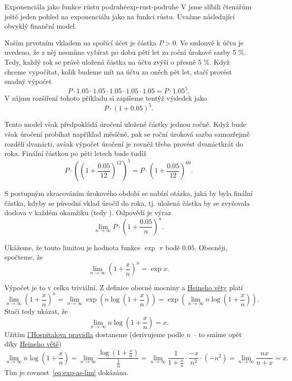 \begin{example}{Exponenciála jako funkce růstu podruhé}{exp-rust-podruhe}
 V  jsme slíbili čtenářům ještě
 jeden pohled na exponenciálu jako na funkci  růstu. Uvažme
 následující obvyklý finanční model.

 Naším prvotním vkladem na spořící účet je částka $P > 0$. Ve smlouvě k účtu je
 uvedeno, že z něj nesmíme vybírat po dobu pěti let za roční úrokové sazby 5 \%.
 Tedy, každý rok se právě uložená částka na účtu zvýší o přesně 5 \%. Když
 chceme vypočítat, kolik budeme mít na účtu za oněch pět let, stačí provést
 snadný výpočet
 \[
  P \cdot 1.05 \cdot 1.05 \cdot 1.05 \cdot 1.05 \cdot 1.05 = P \cdot 1.05^{5}.
 \]
 V zájmu rozšíření tohoto příkladu si zapíšeme tentýž výsledek jako
 \[
  P \cdot \left( 1 + 0.05 \right)^{5}.
 \]
 
 Tento model však předpokládá úročení uložené částky jednou ročně. Když bude
 však úročení probíhat například měsíčně, pak se roční úroková sazba samozřejmě
 rozdělí dvanácti, avšak výpočet úročení je rovněž třeba provést dvanáctkrát do
 roka. Finální částkou po pěti letech bude tudíž
 \[
  P \cdot \left(\left( 1 + \frac{0.05}{12} \right)^{12}\right)^{5} = P \cdot
  \left( 1 + \frac{0.05}{12} \right)^{60}.
 \]
 
 S postupným zkracováním úrokového období se nabízí otázka, jaká by byla finální
 částka, kdyby se původní vklad úročil  do roka, tj. uložená
 částka by se zvyšovala doslova v každém okamžiku (tedy ). Odpovědí
 je výraz
 \[
  \lim_{n \to \infty} P \cdot \left( 1 + \frac{0.05}{n} \right)^{n}.
 \]
 
 Ukážeme, že touto limitou je hodnota funkce $\exp$ v bodě $0.05$. Obecněji,
 spočteme, že
 \begin{equation*}
  \label{eq:exp-as-lim}
  \tag{$\spadesuit$}
  \lim_{n \to \infty} \left( 1 + \frac{x}{n} \right)^{n} = \exp x.
 \end{equation*}

 Výpočet je to v celku triviální. Z definice obecné mocniny a
 \hyperref[cor:heineho-veta-pro-spojitost]{Heineho věty} platí
 \[
  \lim_{n \to \infty} \left( 1 + \frac{x}{n} \right)^{n} = \lim_{n \to \infty}
  \exp \left( n \log \left( 1 + \frac{x}{n} \right) \right) = \exp \left(
  \lim_{n \to \infty} n \log \left(1 + \frac{x}{n}\right) \right).
 \]
 Stačí tedy ukázat, že
 \[
  \lim_{n \to \infty} n \log \left( 1+\frac{x}{n} \right) = x.
 \]
 Užitím \hyperref[thm:lhospital]{l'Hospitalova pravidla} dostaneme (derivujeme
 podle $n$ -- to smíme opět díky \hyperref[thm:heineho]{Heineho větě})
 \[
  \lim_{n \to \infty} n \log \left( 1+\frac{x}{n} \right) = \lim_{n \to \infty}
  \frac{\log \left( 1 + \frac{x}{n} \right)}{\frac{1}{n}} = \lim_{n \to \infty}
  \frac{1}{1+\frac{x}{n}} \cdot \frac{-x}{n^2} \cdot (-n^2) = \lim_{n \to
  \infty} \frac{nx}{n + x} = x.
 \]
 Tím je rovnost~\eqref{eq:exp-as-lim} dokázána.
\end{example}
